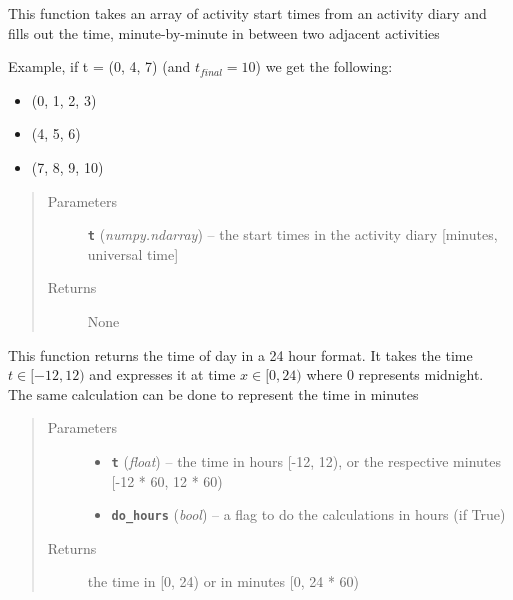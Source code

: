 \documentclass[letterpaper,10pt,english]{sphinxmanual}
\begin{document}

\begin{fulllineitems}
\label{my_globals:my_globals.fill_out_time}
This function takes an array of activity start times from an activity diary and fills out the time,     minute-by-minute in between two adjacent activities

Example, if t = (0, 4, 7) (and \(t_{final}=10\)) we get the following:
\begin{itemize}
\item {} 
(0, 1, 2, 3)

\item {} 
(4, 5, 6)

\item {} 
(7, 8, 9, 10)

\end{itemize}
\begin{quote}\begin{description}
\item[{Parameters}] \leavevmode
\textbf{\texttt{t}} (\emph{numpy.ndarray}) -- the start times in the activity diary {[}minutes, universal time{]}

\item[{Returns}] \leavevmode
None

\end{description}\end{quote}

\end{fulllineitems}


\begin{fulllineitems}
\label{my_globals:my_globals.from_periodic}
This function returns the time of day in a 24 hour format. It takes the time \(t \in [-12, 12)\) and     expresses it at time \(x \in [0, 24)\) where 0 represents midnight. The same calculation can be     done to represent the time in minutes
\begin{quote}\begin{description}
\item[{Parameters}] \leavevmode\begin{itemize}
\item {} 
\textbf{\texttt{t}} (\emph{float}) -- the time in hours {[}-12, 12), or the respective minutes {[}-12 * 60, 12 * 60)

\item {} 
\textbf{\texttt{do\_hours}} (\emph{bool}) -- a flag to do the calculations in hours (if True)

\end{itemize}

\item[{Returns}] \leavevmode
the time in {[}0, 24) or in minutes {[}0, 24 * 60)

\end{description}\end{quote}

\end{fulllineitems}
\end{document}
